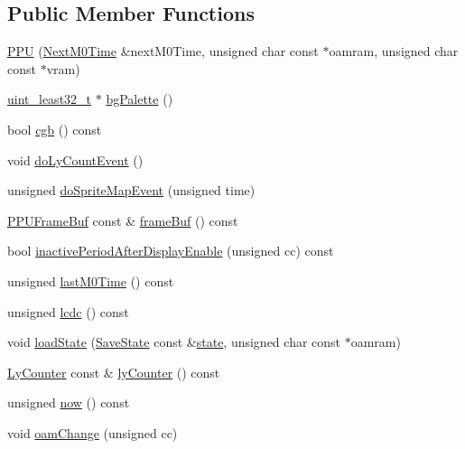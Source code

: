 \subsection*{Public Member Functions}
\begin{DoxyCompactItemize}
\item 
\hyperlink{classgambatte_1_1PPU_a9bd9298e9039c03f51781751d5651cc5}{P\+PU} (\hyperlink{classgambatte_1_1NextM0Time}{Next\+M0\+Time} \&next\+M0\+Time, unsigned char const $\ast$oamram, unsigned char const $\ast$vram)
\item 
\hyperlink{namespacegambatte_a0639f09fccfbbd5a8e0796318768e370}{uint\+\_\+least32\+\_\+t} $\ast$ \hyperlink{classgambatte_1_1PPU_ae81c3ac72e66573b86cc35cec0971482}{bg\+Palette} ()
\item 
bool \hyperlink{classgambatte_1_1PPU_a2753f1ba5217fe22bc0d518b63784825}{cgb} () const
\item 
void \hyperlink{classgambatte_1_1PPU_a283036ab67e35f5687410f131d5170e8}{do\+Ly\+Count\+Event} ()
\item 
unsigned \hyperlink{classgambatte_1_1PPU_a415ef4d53cac6e35dfa9d45650d7ddd0}{do\+Sprite\+Map\+Event} (unsigned time)
\item 
\hyperlink{classgambatte_1_1PPUFrameBuf}{P\+P\+U\+Frame\+Buf} const  \& \hyperlink{classgambatte_1_1PPU_a096a8908b52cfde8d8064b2fde06c1c0}{frame\+Buf} () const
\item 
bool \hyperlink{classgambatte_1_1PPU_aef091fcf827b99f11876f3dc8752ddbc}{inactive\+Period\+After\+Display\+Enable} (unsigned cc) const
\item 
unsigned \hyperlink{classgambatte_1_1PPU_a042e5d2be95bc598fbc0e2114c1540f7}{last\+M0\+Time} () const
\item 
unsigned \hyperlink{classgambatte_1_1PPU_aaafd3c2cf72649e5b144bb2ae6d2457a}{lcdc} () const
\item 
void \hyperlink{classgambatte_1_1PPU_a1b606146dff60d13acd0a5d860b910a1}{load\+State} (\hyperlink{structgambatte_1_1SaveState}{Save\+State} const \&\hyperlink{ppu_8cpp_a2f2eca6997ee7baf8901725ae074d45b}{state}, unsigned char const $\ast$oamram)
\item 
\hyperlink{classgambatte_1_1LyCounter}{Ly\+Counter} const  \& \hyperlink{classgambatte_1_1PPU_ae6bb249f7d93eb7ef39b44f9f398d194}{ly\+Counter} () const
\item 
unsigned \hyperlink{classgambatte_1_1PPU_aeeea3c335760b8f386059c144508e011}{now} () const
\item 
void \hyperlink{classgambatte_1_1PPU_ace3683a992aace437ce28239f43e7ab4}{oam\+Change} (unsigned cc)

\end{DoxyCompactItemize}
